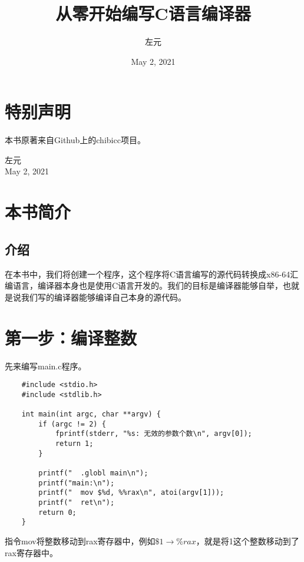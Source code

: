 \documentclass[cn,10pt,math=newtx,citestyle=gb7714-2015,bibstyle=gb7714-2015]{elegantbook}
\title{从零开始编写C语言编译器}
\author{左元}
\date{May 2, 2021}
\begin{document}
\maketitle
\frontmatter

\chapter*{特别声明}


本书原著来自Github上的chibicc项目。

\begin{flushright}
左元 \\
May 2, 2021
\end{flushright}

\tableofcontents

\mainmatter

\chapter{本书简介}

\section{介绍}

在本书中，我们将创建一个程序，这个程序将C语言编写的源代码转换成x86-64汇编语言，编译器本身也是使用C语言开发的。我们的目标是编译器能够自举，也就是说我们写的编译器能够编译自己本身的源代码。

\chapter{第一步：编译整数}

先来编写main.c程序。

\begin{verbatim}
    #include <stdio.h>
    #include <stdlib.h>

    int main(int argc, char **argv) {
        if (argc != 2) {
            fprintf(stderr, "%s: 无效的参数个数\n", argv[0]);
            return 1;
        }

        printf("  .globl main\n");
        printf("main:\n");
        printf("  mov $%d, %%rax\n", atoi(argv[1]));
        printf("  ret\n");
        return 0;
    }
\end{verbatim}

指令mov将整数移动到rax寄存器中，例如$\$1 \rightarrow \%rax$，就是将1这个整数移动到了rax寄存器中。
\end{document}
